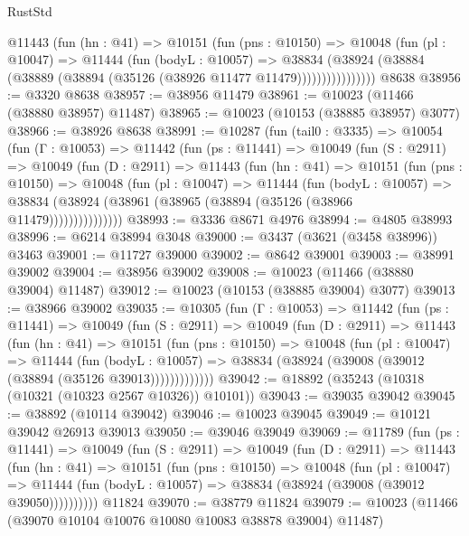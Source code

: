 \begin{lexlean}{RustStd}
\begin{coremodule}
              @11443
                (fun (hn : @41) =>
                @10151
                  (fun (pns : @10150) =>
                  @10048
                    (fun (pl : @10047) =>
                    @11444
                      (fun (bodyL : @10057) =>
                      @38834
                        (@38924
                          (@38884 (@38889 (@38894 (@35126 (@38926 @11477 @11479))))))))))))))))
    @8638
@38956 := @3320 @8638
@38957 := @38956 @11479
@38961 := @10023 (@11466 (@38880 @38957) @11487)
@38965 := @10023 (@10153 (@38885 @38957) @3077)
@38966 := @38926 @8638
@38991 := @10287
    (fun (tail0 : @3335) =>
    @10054
      (fun (Γ : @10053) =>
      @11442
        (fun (ps : @11441) =>
        @10049
          (fun (S : @2911) =>
          @10049
            (fun (D : @2911) =>
            @11443
              (fun (hn : @41) =>
              @10151
                (fun (pns : @10150) =>
                @10048
                  (fun (pl : @10047) =>
                  @11444
                    (fun (bodyL : @10057) =>
                    @38834 (@38924 (@38961 (@38965 (@38894 (@35126 (@38966 @11479)))))))))))))))
@38993 := @3336 @8671 @4976
@38994 := @4805 @38993
@38996 := @6214 @38994 @3048
@39000 := @3437 (@3621 (@3458 @38996)) @3463
@39001 := @11727 @39000
@39002 := @8642 @39001
@39003 := @38991 @39002
@39004 := @38956 @39002
@39008 := @10023 (@11466 (@38880 @39004) @11487)
@39012 := @10023 (@10153 (@38885 @39004) @3077)
@39013 := @38966 @39002
@39035 := @10305
    (fun (Γ : @10053) =>
    @11442
      (fun (ps : @11441) =>
      @10049
        (fun (S : @2911) =>
        @10049
          (fun (D : @2911) =>
          @11443
            (fun (hn : @41) =>
            @10151
              (fun (pns : @10150) =>
              @10048
                (fun (pl : @10047) =>
                @11444
                  (fun (bodyL : @10057) =>
                  @38834 (@38924 (@39008 (@39012 (@38894 (@35126 @39013)))))))))))))
@39042 := @18892 (@35243 (@10318 (@10321 (@10323 @2567 @10326)) @10101))
@39043 := @39035 @39042
@39045 := @38892 (@10114 @39042)
@39046 := @10023 @39045
@39049 := @10121 @39042 @26913 @39013
@39050 := @39046 @39049
@39069 := @11789
    (fun (ps : @11441) =>
    @10049
      (fun (S : @2911) =>
      @10049
        (fun (D : @2911) =>
        @11443
          (fun (hn : @41) =>
          @10151
            (fun (pns : @10150) =>
            @10048
              (fun (pl : @10047) =>
              @11444 (fun (bodyL : @10057) => @38834 (@38924 (@39008 (@39012 @39050))))))))))
    @11824
@39070 := @38779 @11824
@39079 := @10023 (@11466 (@39070 @10104 @10076 @10080 @10083 @38878 @39004) @11487)

\end{coremodule}
\end{lexlean}
